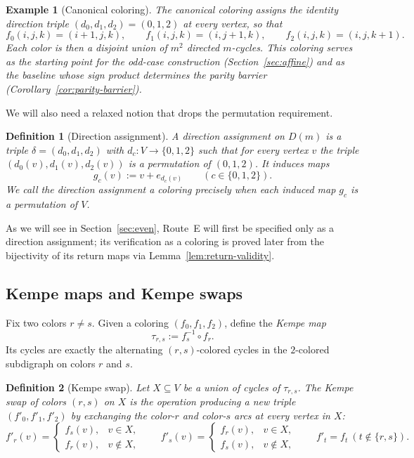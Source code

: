 \documentclass[11pt]{article}
\newtheorem{definition}{Definition}
\newtheorem{example}{Example}
\begin{document}
\begin{example}[Canonical coloring]\label{ex:canonical}
The \emph{canonical coloring} assigns the identity direction triple
$(d_0,d_1,d_2)=(0,1,2)$ at every vertex, so that
\[
f_0(i,j,k)=(i+1,j,k),\qquad f_1(i,j,k)=(i,j+1,k),\qquad f_2(i,j,k)=(i,j,k+1).
\]
Each color is then a disjoint union of $m^2$ directed $m$-cycles.
This coloring serves as the starting point for the odd-case construction (Section~\ref{sec:affine})
and as the baseline whose sign product determines the parity barrier (Corollary~\ref{cor:parity-barrier}).
\end{example}

We will also need a relaxed notion that drops the permutation requirement.

\begin{definition}[Direction assignment]\label{def:direction-assignment}
A \emph{direction assignment} on $D(m)$ is a triple $\delta=(d_0,d_1,d_2)$ with $d_c:V\to\{0,1,2\}$ such that for every vertex $v$ the triple $(d_0(v),d_1(v),d_2(v))$ is a permutation of $(0,1,2)$.
It induces maps
\[
g_c(v):=v+e_{d_c(v)}\qquad (c\in\{0,1,2\}).
\]
We call the direction assignment a \emph{coloring} precisely when each induced map $g_c$ is a permutation of $V$.
\end{definition}

As we will see in Section~\ref{sec:even}, Route~E will first be specified only as a direction assignment;
its verification as a coloring is proved later from the bijectivity of its return maps via Lemma~\ref{lem:return-validity}.

\subsection{Kempe maps and Kempe swaps}
Fix two colors $r\ne s$.
Given a coloring $(f_0,f_1,f_2)$, define the \emph{Kempe map}
\[
\tau_{r,s}:=f_s^{-1}\circ f_r.
\]
Its cycles are exactly the alternating $(r,s)$-colored cycles in the $2$-colored subdigraph on colors $r$ and $s$.

\begin{definition}[Kempe swap]
Let $X\subseteq V$ be a union of cycles of $\tau_{r,s}$.
The \emph{Kempe swap of colors $(r,s)$ on $X$} is the operation producing a new triple $(f'_0,f'_1,f'_2)$ by exchanging the color-$r$ and color-$s$ arcs at every vertex in $X$:
\[
f'_r(v)=
\begin{cases}
f_s(v), & v\in X,\\
f_r(v), & v\notin X,
\end{cases}
\qquad
f'_s(v)=
\begin{cases}
f_r(v), & v\in X,\\
f_s(v), & v\notin X,
\end{cases}
\qquad
f'_t=f_t\ (t\notin\{r,s\}).
\]
\end{definition}
\end{document}
